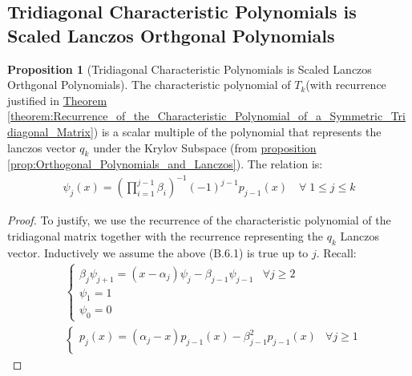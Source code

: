 \documentclass[]{article}
\theoremstyle{definition}
\newtheorem{prop}{Proposition}[section]  %
\begin{document}
\begin{appendices}
        \subsection{Tridiagonal Characteristic Polynomials is Scaled Lanczos Orthgonal Polynomials}
            \begin{prop}[Tridiagonal Characteristic Polynomials is Scaled Lanczos Orthgonal Polynomials]\label{prop:trid_char_poly_orthogonal}
                The characteristic polynomial of $T_k$(with recurrence justified in \hyperref[theorem:Recurrence_of_the_Characteristic_Polynomial_of_a_Symmetric_Tridiagonal_Matrix]{Theorem \ref*{theorem:Recurrence_of_the_Characteristic_Polynomial_of_a_Symmetric_Tridiagonal_Matrix}}) is a scalar multiple of the polynomial that represents the lanczos vector $q_k$ under the Krylov Subspace (from \hyperref[prop:Orthogonal_Polynomials_and_Lanczos]{proposition \ref*{prop:Orthogonal_Polynomials_and_Lanczos}}). The relation is: 
                \begin{align}
                    \psi_j(x) = \left(\prod_{i = 1}^{j-1} \beta_i\right)^{-1}
                    (-1)^{j - 1}p_{j - 1}(x)
                    \quad \forall\; 1 \le j \le k
                \end{align}
            \end{prop}
            \begin{proof}
                To justify, we use the recurrence of the characteristic polynomial of the tridiagonal matrix together with the recurrence representing the $q_k$ Lanczos vector. Inductively we assume the above (B.6.1) is true up to $j$. Recall:
                \begin{align}
                    &\begin{cases}
                        \beta_j \psi_{j + 1} = 
                        (x - \alpha_j)\psi_j - \beta_{j - 1}\psi_{j -1}    
                        & \forall j \ge 2
                        \\
                        \psi_1 = 1
                        \\
                        \psi_0 = 0
                    \end{cases}
                    \\
                    &
                    \begin{cases}
                        p_j(x) = (\alpha_j - x)p_{j - 1}(x) - \beta_{j - 1}^2p_{j - 1}(x)    
                        &
                        \forall j \ge 1
                        \\

\end{cases}
\end{align}
\end{proof}
\end{appendices}
\end{document}
